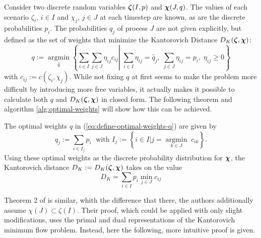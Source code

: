 Consider two discrete random variables $\boldsymbol\zeta(I,p)$ and $\boldsymbol\chi(J,q)$.
The values of each scenario $\zeta_i,\, i\in I$ and $\chi_j,\, j\in J$ at each timestep are known, as are the discrete probabilities $p_i$.
The probabilities $q_j$ of process $J$ are not given explicitly, but defined as the set of weights that minimize the Kantorovich Distance $D_K(\boldsymbol\zeta,\boldsymbol\chi)$:
\begin{equation}
  \label{eq:define-optimal-weights-q}
  q := \underset{\hat{q}}{\operatorname{argmin}}\left\{\sum_{i\in I}\sum_{j\in J}\eta_{ij}c_{ij}\left|\; \sum_{i\in I}\eta_{ij} = \hat{q}_j,\; \sum_{j\in J}\eta_{ij} = p_i,\;\eta_{ij}\geq 0\right.\right\}
\end{equation}
with $c_{ij} := c(\zeta_i,\chi_j)$.
While not fixing $q$ at first seems to make the problem more difficult by introducing more free variables, it actually makes it possible to calculate both $q$ and $D_K(\boldsymbol\zeta,\boldsymbol\chi)$ in closed form.
The following theorem and algorithm \ref{alg:optimal-weights} will show how this can be achieved.
\begin{thm}
  \label{thm:optimal-weights}
  The optimal weights $q$ in (\ref{eq:define-optimal-weights-q}) are given by
  \begin{equation}
    \label{eq:optimal-weights-in-thm}
    q_j := \sum_{i\in I_j} p_i\;\text{ with } I_j:=\left\{i\in I| j = \underset{k\in J}{\operatorname{argmin}}\; c_{ik}\right\}.
  \end{equation}
  Using these optimal weights as the discrete probability distribution for $\boldsymbol\chi$, the Kantorovich distance $D_K:=D_K(\boldsymbol\zeta,\boldsymbol\chi)$ takes on the value
  \begin{equation}
    \label{eq:define-Dk-optimalweights-thm}
    D_K = \sum_{i\in I}p_i\min\limits_{j\in J}c_{ij}
  \end{equation}
\end{thm}
Theorem 2 of  is similar, whith the difference that there, the authors additionally assume $\chi(J)\subset \zeta(I)$.
Their proof, which could be applied with only slight modifications, uses the primal and dual representations of the Kantorovich minimum flow problem.
Instead, here the following, more intuitive proof is given.
